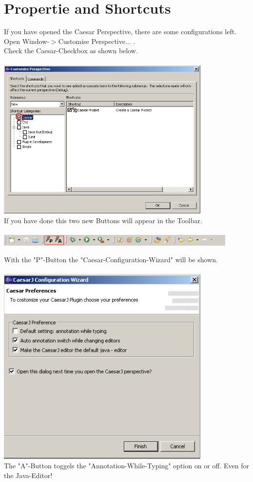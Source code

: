\section{Propertie and Shortcuts}
If you have opened the Caesar Perspective, there are some configurations left. Open Window-$>$Customise Perspective... .\\ Check the Caesar-Checkbox as shown below.\\\\
\includegraphics[width=0.80\textwidth]{images/propert.png}\\

If you have done this two new Buttons will appear in the Toolbar.\\\\
\includegraphics[width=0.90\textwidth]{images/toolbar.png}\newpage

With the "P"-Button the "Caesar-Configuration-Wizard" will be shown.\\\\
\includegraphics[width=0.80\textwidth]{images/view_properties.png}\\

The "A"-Button toggels the "Annotation-While-Typing" option on or off. Even for the Java-Editor!


